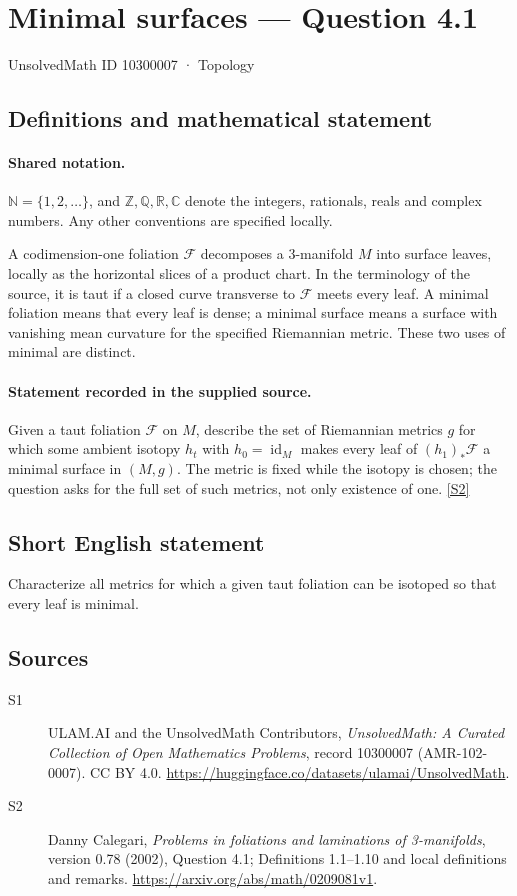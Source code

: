 \documentclass[11pt]{article}
\newcommand{\sref}[2]{\hyperlink{source:#1:#2}{[S#2]}}
\begin{document}
\setcounter{section}{10300006}
\section{Minimal surfaces — Question 4.1}\label{10300007}
{\small\sffamily UnsolvedMath ID 10300007 · Topology}
\subsection{Definitions and mathematical statement}

\paragraph{Shared notation.}$\mathbb N=\{1,2,\ldots\}$, and $\mathbb Z,\mathbb Q,\mathbb R,\mathbb C$ denote the integers, rationals, reals and complex numbers. Any other conventions are specified locally.


A codimension-one foliation $\mathcal F$ decomposes a $3$-manifold $M$ into surface leaves, locally as the horizontal slices of a product chart. In the terminology of the source, it is taut if a closed curve transverse to $\mathcal F$ meets every leaf. A minimal foliation means that every leaf is dense; a minimal surface means a surface with vanishing mean curvature for the specified Riemannian metric. These two uses of minimal are distinct.
\paragraph{Statement recorded in the supplied source.}
Given a taut foliation $\mathcal F$ on $M$, describe the set of Riemannian metrics $g$ for which some ambient isotopy $h_t$ with $h_0=\operatorname{id}_M$ makes every leaf of $(h_1)_*\mathcal F$ a minimal surface in $(M,g)$. The metric is fixed while the isotopy is chosen; the question asks for the full set of such metrics, not only existence of one. \sref{10300007}{2}
\subsection{Short English statement}
Characterize all metrics for which a given taut foliation can be isotoped so that every leaf is minimal.
\subsection{Sources}
\begin{description}
\item[\hypertarget{source:10300007:1}{S1}] ULAM.AI and the UnsolvedMath Contributors, \emph{UnsolvedMath: A Curated Collection of Open Mathematics Problems}, record 10300007 (AMR-102-0007). CC BY 4.0. \url{https://huggingface.co/datasets/ulamai/UnsolvedMath}.
\item[\hypertarget{source:10300007:2}{S2}] Danny Calegari, \emph{Problems in foliations and laminations of 3-manifolds}, version 0.78 (2002), Question 4.1; Definitions 1.1--1.10 and local definitions and remarks. \url{https://arxiv.org/abs/math/0209081v1}.
\end{description}
\label{end:10300007}
\end{document}
